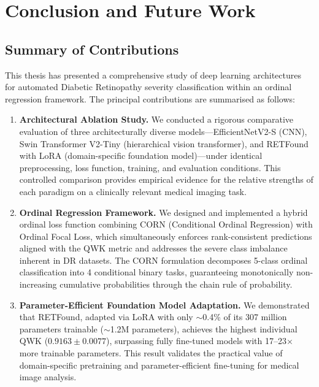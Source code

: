 \chapter{Conclusion and Future Work}
\label{ch:conclusion}

\section{Summary of Contributions}
\label{sec:summary}

This thesis has presented a comprehensive study of deep learning architectures for automated Diabetic Retinopathy severity classification within an ordinal regression framework. The principal contributions are summarised as follows:

\begin{enumerate}
    \item \textbf{Architectural Ablation Study.} We conducted a rigorous comparative evaluation of three architecturally diverse models---EfficientNetV2-S (CNN), Swin Transformer V2-Tiny (hierarchical vision transformer), and RETFound with LoRA (domain-specific foundation model)---under identical preprocessing, loss function, training, and evaluation conditions. This controlled comparison provides empirical evidence for the relative strengths of each paradigm on a clinically relevant medical imaging task.
    
    \item \textbf{Ordinal Regression Framework.} We designed and implemented a hybrid ordinal loss function combining CORN (Conditional Ordinal Regression) with Ordinal Focal Loss, which simultaneously enforces rank-consistent predictions aligned with the QWK metric and addresses the severe class imbalance inherent in DR datasets. The CORN formulation decomposes 5-class ordinal classification into 4 conditional binary tasks, guaranteeing monotonically non-increasing cumulative probabilities through the chain rule of probability.
    
    \item \textbf{Parameter-Efficient Foundation Model Adaptation.} We demonstrated that RETFound, adapted via LoRA with only $\sim$0.4\% of its 307 million parameters trainable ($\sim$1.2M parameters), achieves the highest individual QWK ($0.9163 \pm 0.0077$), surpassing fully fine-tuned models with 17--23$\times$ more trainable parameters. This result validates the practical value of domain-specific pretraining and parameter-efficient fine-tuning for medical image analysis.
    

\end{enumerate}
